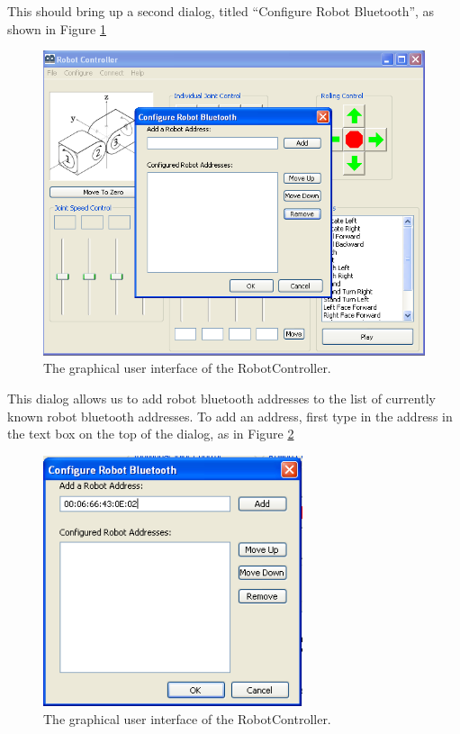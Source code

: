 \documentclass{article}
\begin{document}
This should bring up a second dialog, titled ``Configure Robot Bluetooth'', as
shown in Figure \ref{fig:shot4.png}

\begin{figure}[H]
\begin{center}
\includegraphics[width=4.5in]{images/shot4.png}
\end{center}
\caption{\label{fig:shot4.png} The graphical user interface of the RobotController.}
\end{figure}

This dialog allows us to add robot bluetooth addresses to the list of currently
known robot bluetooth addresses. To add an address, first type in the address
in the text box on the top of the dialog, as in Figure \ref{fig:shot5.png}

\begin{figure}[H]
\begin{center}
\includegraphics[width=3in]{images/shot5.png}
\end{center}
\caption{\label{fig:shot5.png} The graphical user interface of the RobotController.}
\end{figure}
\end{document}
